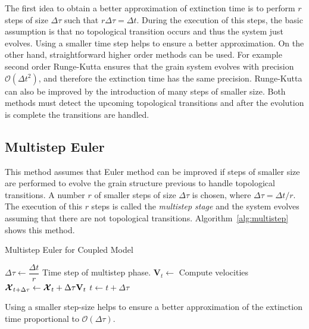 %
The first idea to obtain a better approximation of extinction time is to perform $r$ steps of size $\Delta \tau$ such that $r \Delta \tau = \Delta t$. During the execution of this steps, the basic assumption is that no topological transition occurs and thus the system just evolves. Using a smaller time step helps to ensure a better approximation. On the other hand, straightforward higher order methods can be used. For example second order Runge-Kutta ensures that the grain system evolves with precision $\mathcal{O}(\Delta t^2)$, and therefore the extinction time has the same precision. Runge-Kutta can also be improved by the introduction of many steps of smaller size. Both methods must detect the upcoming topological transitions and after the evolution is complete the transitions are handled.


\subsection{Multistep Euler}

This method assumes that Euler method can be improved if steps of smaller size are performed to evolve the grain structure previous to handle topological transitions. A number $r$ of smaller steps of size $\Delta \tau$ is chosen, where $\Delta \tau = \Delta t / r$. The execution of this $r$ steps is called the \emph{multistep stage} and the system evolves assuming that there are not topological transitions. Algorithm~\ref{alg:multistep} shows this method.

\begin{algorithm}
\caption{Multistep Euler for Coupled Model}
\label{alg:multistep}
\begin{algorithmic}[1]
\State $\Delta \tau \gets \dfrac{\Delta t}{r}$ Time step of multistep phase.
\State $\mathbf{V}_t \gets$ Compute velocities
\State $\bm{\mathcal{X}}_{t + \Delta \tau} \gets \bm{\mathcal{X}}_{t} + \Delta \tau \mathbf{V}_t$
\State $t \gets t + \Delta \tau$
\EndFor
\EndProcedure
\end{algorithmic}
\end{algorithm}

Using a smaller step-size helps to ensure a better approximation of the extinction time proportional to $\mathcal{O}(\Delta \tau)$.

